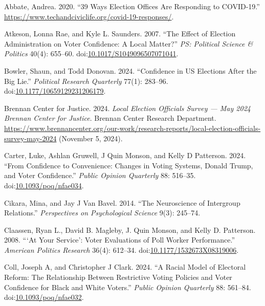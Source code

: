 \documentclass[
  12pt,
  letterpaper,
]{article}
\newlength{\cslhangindent}
\newenvironment{CSLReferences}[2] %
 {\begin{list}{}{%
  \setlength{\itemindent}{0pt}
  \setlength{\leftmargin}{0pt}
  \setlength{\parsep}{0pt}
  \ifodd #1
   \setlength{\leftmargin}{\cslhangindent}
   \setlength{\itemindent}{-1\cslhangindent}
  \fi
  \setlength{\itemsep}{#2\baselineskip}}}
 {\end{list}}
\begin{document}
\label{refs}
\begin{CSLReferences}{1}{1}
Abbate, Andrea. 2020. {``39 {Ways Election Offices} Are {Responding} to
{COVID-19}.''}
\url{https://www.techandciviclife.org/covid-19-responses/}.

Atkeson, Lonna Rae, and Kyle L. Saunders. 2007. {``The {Effect} of
{Election Administration} on {Voter Confidence}: {A Local Matter}?''}
\emph{PS: Political Science \& Politics} 40(4): 655--60.
doi:\href{https://doi.org/10.1017/S1049096507071041}{10.1017/S1049096507071041}.

Bowler, Shaun, and Todd Donovan. 2024. {``Confidence in {US Elections
After} the {Big Lie}.''} \emph{Political Research Quarterly} 77(1):
283--96.
doi:\href{https://doi.org/10.1177/10659129231206179}{10.1177/10659129231206179}.

Brennan Center for Justice. 2024. \emph{Local {Election Officials
Survey} --- {May} 2024 \textbar{} {Brennan Center} for {Justice}}.
Brennan Center Research Department.
\url{https://www.brennancenter.org/our-work/research-reports/local-election-officials-survey-may-2024}
(November 5, 2024).

Carter, Luke, Ashlan Gruwell, J Quin Monson, and Kelly D Patterson.
2024. {``From {Confidence} to {Convenience}: {Changes} in {Voting
Systems}, {Donald Trump}, and {Voter Confidence}.''} \emph{Public
Opinion Quarterly} 88: 516--35.
doi:\href{https://doi.org/10.1093/poq/nfae034}{10.1093/poq/nfae034}.

Cikara, Mina, and Jay J Van Bavel. 2014. {``The {Neuroscience} of
{Intergroup Relations}.''} \emph{Perspectives on Psychological Science}
9(3): 245--74.

Claassen, Ryan L., David B. Magleby, J. Quin Monson, and Kelly D.
Patterson. 2008. {``{`{At Your Service}'}: {Voter Evaluations} of {Poll
Worker Performance}.''} \emph{American Politics Research} 36(4):
612--34.
doi:\href{https://doi.org/10.1177/1532673X08319006}{10.1177/1532673X08319006}.

Coll, Joseph A, and Christopher J Clark. 2024. {``A {Racial Model} of
{Electoral Reform}: {The Relationship} Between {Restrictive Voting
Policies} and {Voter Confidence} for {Black} and {White Voters}.''}
\emph{Public Opinion Quarterly} 88: 561--84.
doi:\href{https://doi.org/10.1093/poq/nfae032}{10.1093/poq/nfae032}.


\end{CSLReferences}
\end{document}
